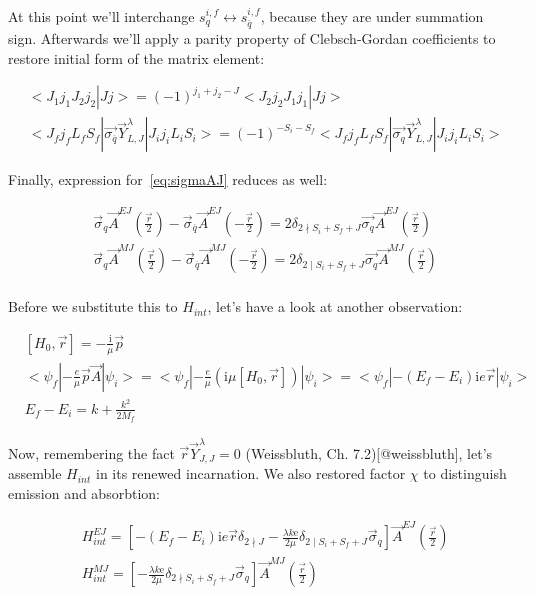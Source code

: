 At this point we'll interchange $s^{i,f}_{q} \leftrightarrow s^{i,f}_{\overline{q}}$, because they are under summation sign. Afterwards we'll apply a parity property of Clebsch-Gordan coefficients to restore initial form of the matrix element:

\begin{align}
    &<J_1 j_1 J_2 j_2 | J j> = (-1)^{j_1 + j_2 - J} <J_2 j_2 J_1 j_1 | J j> \\
    &<J_f j_f L_f S_f| \vec{\sigma_{\overline{q}}} \vec{Y}_{L, J}^\lambda |J_i j_i L_i S_i> = (-1)^{-S_i - S_f} <J_f j_f L_f S_f| \vec{\sigma_{q}} \vec{Y}_{L, J}^\lambda |J_i j_i L_i S_i>
\end{align}

Finally, expression for~\cref{eq:sigmaAJ} reduces as well:

\begin{align}
    &\vec{\sigma}_{q} \vec{A}^{EJ}(\frac{\vec{r}}{2}) - \vec{\sigma}_{\overline{q}} \vec{A}^{EJ}(-\frac{\vec{r}}{2}) = 2 \delta_{2 \nmid S_i + S_f + J} \vec{\sigma_{q}} \vec{A}^{EJ}(\frac{\vec{r}}{2}) \\
    &\vec{\sigma}_{q} \vec{A}^{MJ}(\frac{\vec{r}}{2}) - \vec{\sigma}_{\overline{q}} \vec{A}^{MJ}(-\frac{\vec{r}}{2}) = 2 \delta_{2 \mid S_i + S_f + J} \vec{\sigma_{q}} \vec{A}^{MJ}(\frac{\vec{r}}{2}) \\
\end{align}

Before we substitute this to $H_{int}$, let's have a look at another observation:

\begin{align}
    &[H_0, \vec{r}] = -\frac{\mathrm{i}}{\mu} \vec{p} \\
    &<\psi_f| -\frac{e}{\mu} \vec{p} \vec{A} |\psi_i> = <\psi_f| -\frac{e}{\mu} \left( \mathrm{i} \mu [H_0, \vec{r}]  \right) |\psi_i> = <\psi_f| -(E_f - E_i) \mathrm{i} e \vec{r} |\psi_i> \\
    &E_f - E_i = k + \frac{k^2}{2 M_f}
\end{align}

Now, remembering the fact $\vec{r} \vec{Y}^\lambda_{J, J} = 0$ (Weissbluth, Ch. 7.2)[@weissbluth], let's assemble $H_{int}$ in its renewed incarnation. We also restored factor $\chi$ to distinguish emission and absorbtion:

\begin{align}
    &H_{int}^{EJ} = \left[-(E_f - E_i) \mathrm{i} e \vec{r} \delta_{2 \nmid J} - \frac{\lambda k \mathrm{e}}{2 \mu} \delta_{2 \mid S_i + S_f + J} \vec{\sigma}_{q} \right] \vec{A}^{EJ}(\frac{\vec{r}}{2}) \\
    &H_{int}^{MJ} = \left[ -\frac{\lambda k \mathrm{e}}{2 \mu} \delta_{2 \nmid S_i + S_f + J} \vec{\sigma}_{q} \right] \vec{A}^{MJ}(\frac{\vec{r}}{2})
\end{align}

